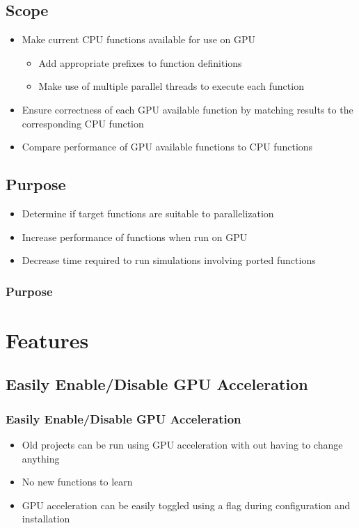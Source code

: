 \documentclass{beamer}
\begin{document}
\subsection{Scope}
\begin{frame}
\begin{itemize}
\frametitle{Scope}
\item Make current CPU functions available for use on GPU
\begin{itemize}
\item Add appropriate prefixes to function definitions
\item Make use of multiple parallel threads to execute each function
\end{itemize}
\item Ensure correctness of each GPU available function by matching results to the corresponding CPU function
\item Compare performance of GPU available functions to CPU functions
\end{itemize}
\end{frame}

\subsection{Purpose}
\begin{frame}
\begin{itemize}
\item Determine if target functions are suitable to parallelization 
\item Increase performance of functions when run on GPU
\item Decrease time required to run simulations involving ported functions
\end{itemize}
\frametitle{Purpose}
\end{frame}


\section{Features}
\subsection{Easily Enable/Disable GPU Acceleration}
\begin{frame}
\frametitle{Easily Enable/Disable GPU Acceleration}
\begin{itemize}
\item Old projects can be run using GPU acceleration with out having to change anything 
\item No new functions to learn
\item GPU acceleration can be easily toggled using a flag during configuration and installation
\end{itemize}
\end{frame}
\end{document}
